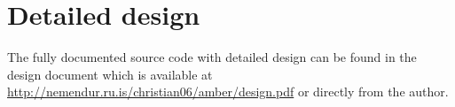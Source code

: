 






\chapter{Detailed design}

The fully documented source code with detailed design can be found in the
design document which is available at
\url{http://nemendur.ru.is/christian06/amber/design.pdf} or directly from the
author.


